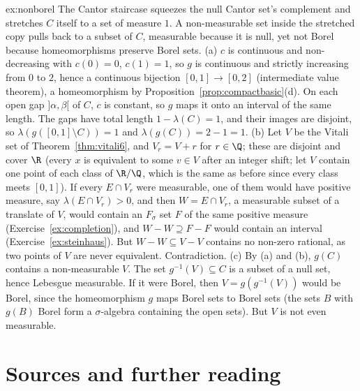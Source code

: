 \begin{solution}{ex:nonborel}
\idea The Cantor staircase squeezes the null Cantor set's complement and stretches $C$ itself to a set of measure $1$. A non-measurable set inside the stretched
copy pulls back to a subset of $C$, measurable because it is null, yet not Borel because homeomorphisms preserve Borel sets.
\writeup (a) $c$ is continuous and non-decreasing with $c(0)=0$, $c(1)=1$, so $g$ is continuous and strictly increasing from $0$ to $2$, hence a continuous bijection $[0,1]\to[0,2]$
(intermediate value theorem), a homeomorphism by Proposition~\ref{prop:compactbasic}(d). On each open gap $]\alpha,\beta[$ of $C$, $c$ is constant, so $g$ maps it onto an interval of the same length. The
gaps have total length $1-\lambda(C)=1$, and their images are disjoint, so $\lambda(g([0,1]\setminus C))=1$ and $\lambda(g(C))=2-1=1$.
(b) Let $V$ be the Vitali set of Theorem~\ref{thm:vitali6}, and $V_r=V+r$ for $r\in\Q$; these are disjoint and cover $\R$ (every $x$ is equivalent to some $v\in V$ after an integer shift; let $V$
contain one point of each class of $\R/\Q$, which is the same as before since every class meets $[0,1]$). If every $E\cap V_r$ were measurable, one of them would have positive
measure, say $\lambda(E\cap V_r)>0$, and then $W=E\cap V_r$, a measurable subset of a translate of $V$, would contain an $F_\sigma$ set $F$ of the same positive measure (Exercise~\ref{ex:completion}), and $W-W\supseteq F-F$ would contain an interval
(Exercise~\ref{ex:steinhaus}). But $W-W\subseteq V-V$ contains no non-zero rational, as two points of $V$ are never equivalent. Contradiction.
(c) By (a) and (b), $g(C)$ contains a non-measurable $V$. The set $g^{-1}(V)\subseteq C$ is a subset of a null set, hence Lebesgue measurable. If it were Borel, then $V=g(g^{-1}(V))$ would
be Borel, since the homeomorphism $g$ maps Borel sets to Borel sets (the sets $B$ with $g(B)$ Borel form a $\sigma$-algebra containing the open sets). But $V$ is not even measurable.
\end{solution}

\section*{Sources and further reading}

